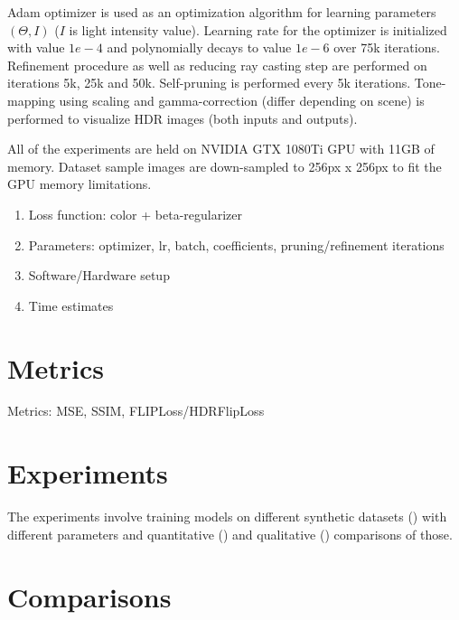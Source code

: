 Adam optimizer is used as an optimization algorithm for learning parameters $(\Theta, I)$ ($I$ is light intensity value).
Learning rate for the optimizer is initialized with value $1e-4$
and polynomially decays to value $1e-6$ over 75k iterations.
Refinement procedure as well as reducing ray casting step are performed on iterations 5k, 25k and 50k.
Self-pruning is performed every 5k iterations.
Tone-mapping using scaling and gamma-correction (differ depending on scene)
is performed to visualize HDR images (both inputs and outputs).

All of the experiments are held on NVIDIA GTX 1080Ti GPU with 11GB of memory.
Dataset sample images are down-sampled to 256px x 256px to fit the GPU memory limitations.


\begin{enumerate}
    \item Loss function: color + beta-regularizer
    \item Parameters: optimizer, lr, batch, coefficients, pruning/refinement iterations
    \item Software/Hardware setup
    \item Time estimates
\end{enumerate}



\section{Metrics}

Metrics: MSE, SSIM, FLIPLoss/HDRFlipLoss


\section{Experiments}

The experiments involve training models on different synthetic datasets () with different parameters
and quantitative () and qualitative () comparisons of those.



\section{Comparisons}

